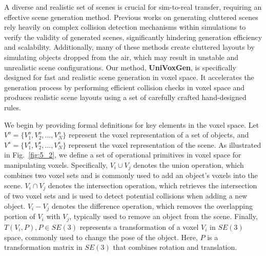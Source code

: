 A diverse and realistic set of scenes is crucial for sim-to-real transfer, requiring an effective scene generation method.
Previous works on generating cluttered scenes~\cite{wada2022safepicking, li2024broadcasting, xu2023joint, qian2024thinkgrasp,yang2024ground4act,wang2024learning} rely heavily on complex collision detection mechanisms within simulations to verify the validity of generated scenes, significantly hindering generation efficiency and scalability. Additionally, many of these methods \cite{wada2022safepicking, li2024broadcasting, xu2023joint, qian2024thinkgrasp,yang2024ground4act,wang2024learning} create cluttered layouts by simulating objects dropped from the air, which may result in unstable and unrealistic scene configurations.
Our method, \textbf{UniVoxGen}, is specifically designed for fast and realistic scene generation in voxel space. It accelerates the generation process by performing efficient collision checks in voxel space and produces realistic scene layouts using a set of carefully crafted hand-designed rules.

We begin by providing formal definitions for key elements in the voxel space. Let $V^o = \{V^o_{1}, V^o_{2}, \dots, V^o_{N}\}$ represent the voxel representation of a set of objects, and $V^s = \{V^s_{1}, V^s_{2}, \dots, V^s_{N}\}$ represent the voxel representation of the scene. As illustrated in Fig.~\ref{fig:5_2}, we define a set of operational primitives in voxel space for manipulating voxels. Specifically, $V_i \cup V_j$ denotes the union operation, which combines two voxel sets and is commonly used to add an object’s voxels into the scene. $V_i \cap V_j$ denotes the intersection operation, which retrieves the intersection of two voxel sets and is used to detect potential collisions when adding a new object. $V_i - V_j$ denotes the difference operation, which removes the overlapping portion of $V_i$ with $V_j$, typically used to remove an object from the scene. 
Finally, $T(V_i, P), P \in {SE}(3)$ represents a transformation of a voxel $V_i$ in ${SE}(3)$ space, commonly used to change the pose of the object. Here, $P$ is a transformation matrix in ${SE(3)}$ that combines rotation and translation.

